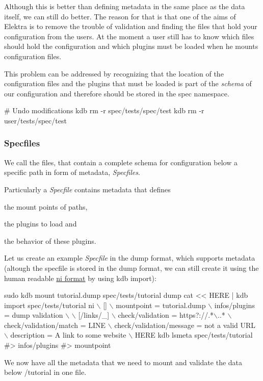 Although this is better than defining metadata in the same place as the data itself, we can still do better. The reason for that is that one of the aims of Elektra is to remove the trouble of validation and finding the files that hold your configuration from the users. At the moment a user still has to know which files should hold the configuration and which plugins must be loaded when he mounts configuration files.

This problem can be addressed by recognizing that the location of the configuration files and the plugins that must be loaded is part of the {\itshape schema} of our configuration and therefore should be stored in the spec namespace.


\begin{DoxyCode}
# Undo modifications
kdb rm -r spec/tests/spec/test
kdb rm -r user/tests/spec/test
\end{DoxyCode}


\subsubsection*{Specfiles}

We call the files, that contain a complete schema for configuration below a specific path in form of metadata, {\itshape Specfiles}.

Particularly a {\itshape Specfile} contains metadata that defines
\begin{DoxyItemize}
\item the mount points of paths,
\item the plugins to load and
\item the behavior of these plugins.
\end{DoxyItemize}

Let us create an example {\itshape Specfile} in the dump format, which supports metadata (altough the specfile is stored in the dump format, we can still create it using the human readable \hyperlink{md_src_plugins_ni_README_src_plugins_ni_README_md}{ni format} by using {\ttfamily kdb import})\+: 
\begin{DoxyCode}
sudo kdb mount tutorial.dump spec/tests/tutorial dump
cat << HERE | kdb import spec/tests/tutorial ni  \(\backslash\)
[]                                         \(\backslash\)
 mountpoint = tutorial.dump                \(\backslash\)
 infos/plugins = dump validation           \(\backslash\)
                                           \(\backslash\)
[/links/\_]                                 \(\backslash\)
check/validation = https?://.*\(\backslash\)..*         \(\backslash\)
check/validation/match = LINE              \(\backslash\)
check/validation/message = not a valid URL \(\backslash\)
description = A link to some website       \(\backslash\)
HERE
kdb lsmeta spec/tests/tutorial
#> infos/plugins
#> mountpoint
\end{DoxyCode}
 We now have all the metadata that we need to mount and validate the data below {\ttfamily /tutorial} in one file.

